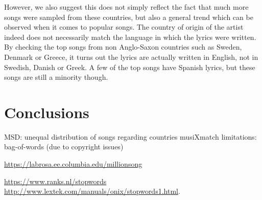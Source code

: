 \documentclass[11pt]{article}
\renewcommand\_{\textunderscore\allowbreak}
\begin{document}
However, we also suggest this does not simply reflect the fact that much more songs were sampled from these countries, but also a general trend which can be observed when it comes to popular songs.
The country of origin of the artist indeed does not necessarily match the language in which the lyrics were written.
By checking the top songs from non Anglo-Saxon countries such as Sweden, Denmark or Greece, it turns out the lyrics are actually written in English, not in Swedish, Danish or Greek.
A few of the top songs have Spanish lyrics, but these songs are still a minority though.




	
\section{Conclusions}

MSD: unequal distribution of songs regarding countries
musiXmatch limitations: bag-of-words (due to copyright issues)





\begin{thebibliography}{}

\url{https://labrosa.ee.columbia.edu/millionsong}

\url{https://www.ranks.nl/stopwords}\\
\url{http://www.lextek.com/manuals/onix/stopwords1.html}.


\end{thebibliography}
\end{document}
